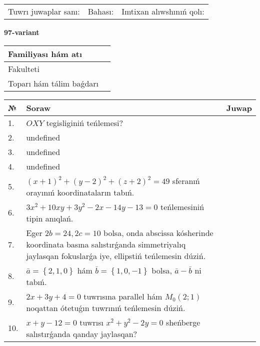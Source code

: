 \documentclass{article}
\begin{document}
\vspace{0.7cm}

\begin{tabular}{lll}
Tuwrı juwaplar sanı: \underline{\hspace{1cm}} & 
Bahası: \underline{\hspace{1cm}} & 
Imtixan alıwshınıń qolı: \underline{\hspace{2cm}} \\
\end{tabular}

\egroup

\newpage


\textbf{97-variant}\\

\bgroup
\def\arraystretch{1.6} %

\begin{tabular}{|m{5.7cm}|m{9.5cm}|}
\hline
Familiyası hám atı & \\
\hline
Fakulteti  & \\
\hline
Toparı hám tálim baǵdarı  & \\
\hline
\end{tabular}

\vspace{0.7cm}

\begin{tabular}{|m{0.7cm}|m{10cm}|m{4cm}|}
\hline
№ & Soraw & Juwap \\
\hline
1. & \(OXY\) tegisliginiń teńlemesi? &  \\
\hline
2. & undefined &  \\
\hline
3. & undefined &  \\
\hline
4. & undefined &  \\
\hline
5. & \((x + 1) ^{2} + (y - 2) ^{2} + (z + 2) ^{2} = 49\) sferanıń orayınıń koordinataların tabıń. &  \\
\hline
6. & \(3 x^{2} + 10 xy + 3 y^{2} - 2 x - 14 y - 13 = 0\) teńlemesiniń tipin anıqlań. &  \\
\hline
7. & Eger \(2 b = 24, 2 c = 10\) bolsa, onda abscissa kósherinde koordinata basına salıstırǵanda simmetriyalıq jaylasqan fokuslarǵa iye, ellipstiń teńlemesin dúziń. &  \\
\hline
8. & \(\bar{a} = \left\{ 2, 1, 0 \right\}\) hám \(\bar{b} = \left\{ 1, 0,- 1 \right\}\) bolsa, \(\bar{a} - \bar{b}\) ni tabıń. &  \\
\hline
9. & \(2 x + 3 y + 4 = 0\) tuwrısına parallel hám \(M_{0} (2;1)\) noqattan ótetuǵın tuwrınıń teńlemesin dúziń. &  \\
\hline
10. & \(x + y - 12 = 0\) tuwrısı \(x^{2} + y^{2} - 2 y = 0\) sheńberge salıstırǵanda qanday jaylasqan? & \\
\hline
\end{tabular}
\end{document}

